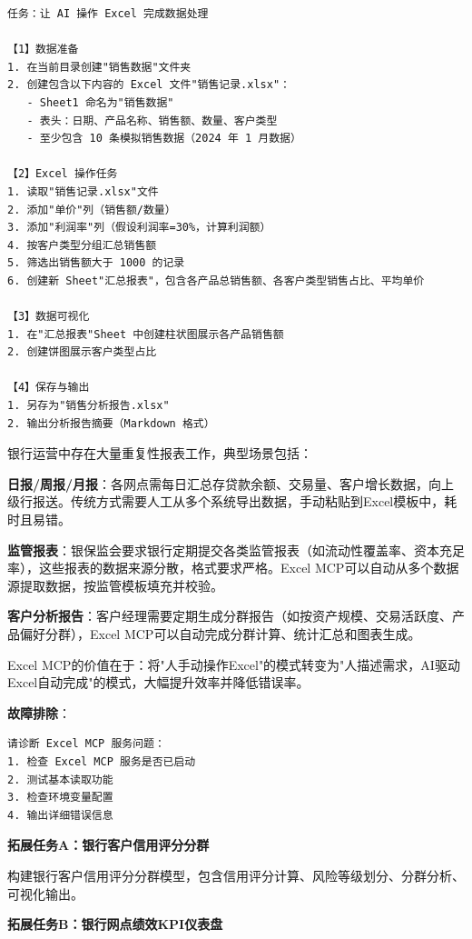 \begin{lstlisting}
任务：让 AI 操作 Excel 完成数据处理

【1】数据准备
1. 在当前目录创建"销售数据"文件夹
2. 创建包含以下内容的 Excel 文件"销售记录.xlsx"：
   - Sheet1 命名为"销售数据"
   - 表头：日期、产品名称、销售额、数量、客户类型
   - 至少包含 10 条模拟销售数据（2024 年 1 月数据）

【2】Excel 操作任务
1. 读取"销售记录.xlsx"文件
2. 添加"单价"列（销售额/数量）
3. 添加"利润率"列（假设利润率=30%，计算利润额）
4. 按客户类型分组汇总销售额
5. 筛选出销售额大于 1000 的记录
6. 创建新 Sheet"汇总报表"，包含各产品总销售额、各客户类型销售占比、平均单价

【3】数据可视化
1. 在"汇总报表"Sheet 中创建柱状图展示各产品销售额
2. 创建饼图展示客户类型占比

【4】保存与输出
1. 另存为"销售分析报告.xlsx"
2. 输出分析报告摘要（Markdown 格式）
\end{lstlisting}

\begin{theorybox}[银行运营中的报表自动化需求]
银行运营中存在大量重复性报表工作，典型场景包括：

\textbf{日报/周报/月报}：各网点需每日汇总存贷款余额、交易量、客户增长数据，向上级行报送。传统方式需要人工从多个系统导出数据，手动粘贴到Excel模板中，耗时且易错。

\textbf{监管报表}：银保监会要求银行定期提交各类监管报表（如流动性覆盖率、资本充足率），这些报表的数据来源分散，格式要求严格。Excel MCP可以自动从多个数据源提取数据，按监管模板填充并校验。

\textbf{客户分析报告}：客户经理需要定期生成分群报告（如按资产规模、交易活跃度、产品偏好分群），Excel MCP可以自动完成分群计算、统计汇总和图表生成。

Excel MCP的价值在于：将"人手动操作Excel"的模式转变为"人描述需求，AI驱动Excel自动完成"的模式，大幅提升效率并降低错误率。
\end{theorybox}

\textbf{故障排除}：

\begin{lstlisting}
请诊断 Excel MCP 服务问题：
1. 检查 Excel MCP 服务是否已启动
2. 测试基本读取功能
3. 检查环境变量配置
4. 输出详细错误信息
\end{lstlisting}

\textbf{拓展任务A：银行客户信用评分分群}

构建银行客户信用评分分群模型，包含信用评分计算、风险等级划分、分群分析、可视化输出。

\textbf{拓展任务B：银行网点绩效KPI仪表盘}

